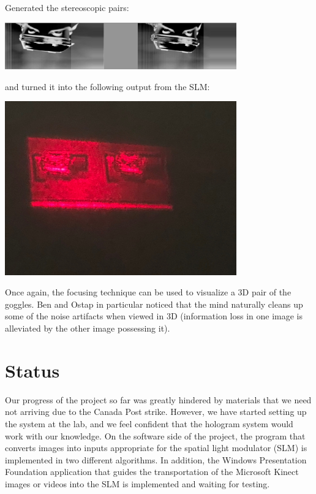 \documentclass[12pt]{article}
\begin{document}
Generated the stereoscopic pairs:

\begin{center}
\includegraphics[width=100mm]{goggle_stereoscopic.png}
\end{center}

and turned it into the following output from the SLM:

\begin{center}
\includegraphics[width=100mm]{final_hologram.jpg}
\end{center}

Once again, the focusing technique can be used to visualize a 3D pair of the goggles. Ben and Ostap in particular noticed that the mind naturally cleans up some of the noise artifacts when viewed in 3D (information loss in one image is alleviated by the other image possessing it).

\section{Status}
Our progress of the project so far was greatly hindered by materials that we need not arriving due to the Canada Post strike. However, we have started setting up the system at the lab, and we feel confident that the hologram system would work with our knowledge. On the software side of the project, the program that converts images into inputs appropriate for the spatial light modulator (SLM) is implemented in two different algorithms. In addition, the Windows Presentation Foundation application that guides the transportation of the Microsoft Kinect images or videos into the SLM is implemented and waiting for testing.
\end{document}
